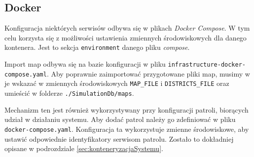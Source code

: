 \subsection{Docker}

\par Konfiguracja niektórych serwisów odbywa się w plikach \emph{Docker Compose}\cite{DOCKER_COMPOSE_DOCS}. W tym celu korzysta się z możliwości ustawienia zmiennych środowiskowych dla danego kontenera. Jest to sekcja \texttt{environment} danego pliku \emph{compose}.

\par Import map odbywa się na bazie konfiguracji w pliku \texttt{infrastructure-docker-compose.yaml}. Aby poprawnie zaimportować przygotowane pliki map, musimy w je wskazać w zmiennych środowiskowych \texttt{MAP\_FILE} i \texttt{DISTRICTS\_FILE} oraz umieścić w folderze \texttt{./SimulationDb/maps}.

\par Mechanizm ten jest również wykorzystywany przy konfiguracji patroli, biorących udział w działaniu systemu. Aby dodać patrol należy go zdefiniować w pliku \texttt{docker-compose.yaml}. Konfiguracja ta wykorzystuje zmienne środowiskowe, aby ustawić odpowiednie identyfikatory serwisom patrolu. Zostało to dokładniej opisane w podrozdziale \ref{sec:konteneryzacjaSystemu}.

